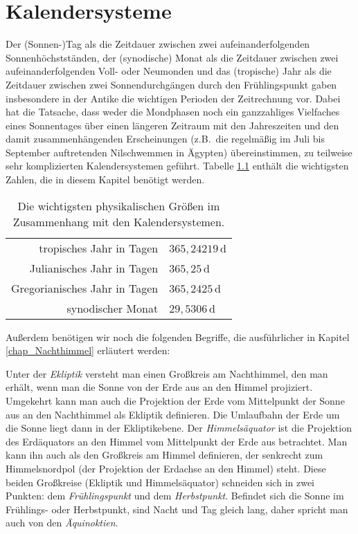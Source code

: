 
\chapter{Kalendersysteme}

Der (Sonnen-)Tag als die Zeitdauer zwischen zwei aufeinanderfolgenden Sonnenh\"ochstst\"anden, der 
(synodische) Monat als die Zeitdauer zwischen zwei aufeinanderfolgenden Voll- oder Neumonden und das 
(tropische) Jahr als die Zeitdauer zwischen zwei Sonnendurchg\"angen durch den Fr\"uhlingspunkt
gaben insbesondere in der Antike die wichtigen Perioden der Zeitrechnung vor. Dabei hat
die Tatsache, dass weder die Mondphasen noch ein ganzzahliges Vielfaches eines Sonnentages 
\"uber einen l\"angeren Zeitraum mit den Jahreszeiten und den damit zusammenh\"angenden 
Erscheinungen (z.B.\ die regelm\"a\ss ig im Juli bis September auftretenden Nilschwemmen in \"Agypten)
\"ubereinstimmen, zu teilweise sehr komplizierten Kalendersystemen gef\"uhrt. 
Tabelle \ref{tab_Kal} enth\"alt die wichtigsten Zahlen, die in diesem Kapitel ben\"otigt werden.

\begin{table}[htb]
\begin{tabular}{r|l}
tropisches Jahr in Tagen &  $365, 24219$\,d   \\
Julianisches Jahr in Tagen &  $365,25$\,d \\
Gregorianisches Jahr in Tagen & $ 365,2425$\,d \\
synodischer Monat &  $29,5306$\,d \\
\end{tabular}
\caption{\label{tab_Kal}%
Die wichtigsten physikalischen Gr\"o\ss en im Zusammenhang mit den
Kalendersystemen.}
\end{table}

Au\ss erdem ben\"otigen wir noch die folgenden Begriffe, die ausf\"uhrlicher in
Kapitel \ref{chap_Nachthimmel} erl\"autert werden:

Unter der \textit{Ekliptik} 
versteht man einen Gro\ss kreis am Nachthimmel, den man erh\"alt,
wenn man die Sonne von der Erde aus an den Himmel projiziert. Umgekehrt kann man auch
die Projektion der Erde vom Mittelpunkt der Sonne aus an den Nachthimmel als Ekliptik 
definieren. Die Umlaufbahn der Erde um die Sonne liegt dann in der Ekliptikebene.
Der \textit{Himmels\"aquator} ist die Projektion des Erd\"aquators an den Himmel vom Mittelpunkt 
der Erde aus betrachtet.
Man kann ihn auch als den Gro\ss kreis am Himmel definieren, der senkrecht zum
Himmelsnordpol (der Projektion der Erdachse an den Himmel) steht. Diese beiden
Gro\ss kreise (Ekliptik und Himmels\"aquator) schneiden sich in zwei Punkten:
dem \textit{Fr\"uhlingspunkt}
und dem \textit{Herbstpunkt}.
Befindet sich die Sonne im Fr\"uhlings- oder Herbstpunkt, sind Nacht und Tag
gleich lang, daher spricht man auch von den \textit{\"Aquinoktien}.

